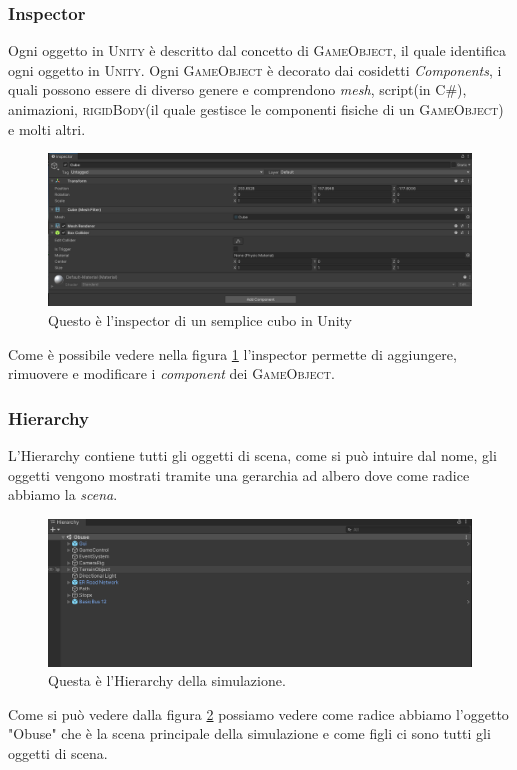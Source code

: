 \documentclass[12pt, openany]{book}
\begin{document}
	\subsubsection{Inspector}
	Ogni oggetto in \textsc{Unity} è descritto dal concetto di \textsc{GameObject}, il quale identifica ogni oggetto in \textsc{Unity}. Ogni \textsc{GameObject} è decorato dai cosidetti \emph{Components}, i quali possono essere di diverso genere e comprendono \emph{mesh}, script(in C\#), animazioni, \textsc{rigidBody}(il quale gestisce le componenti fisiche di un \textsc{GameObject}) e molti altri.
	\begin{figure}[H]
		\centering
		\includegraphics[width=1\linewidth]{"Immagini/Inspector"}
		\caption{Questo è l'inspector di un semplice cubo in Unity}
		\label{fig:Inspector}
	\end{figure}

	Come è possibile vedere nella figura \ref{fig:Inspector} l'inspector permette di aggiungere, rimuovere e modificare i \emph{component} dei \textsc{GameObject}.
	\subsubsection{Hierarchy}
	L'Hierarchy contiene tutti gli oggetti di scena, come si può intuire dal nome, gli oggetti vengono mostrati tramite una gerarchia ad albero dove come radice abbiamo la \emph{scena}.
	\begin{figure}[H]
		\centering
		\includegraphics[width=1\linewidth]{"Immagini/Hierarchy"}
		\caption{Questa è l'Hierarchy della simulazione.}
		\label{fig:Hierarchy}
	\end{figure}
	Come si può vedere dalla figura \ref{fig:Hierarchy} possiamo vedere come radice abbiamo l'oggetto "Obuse" che è la scena principale della simulazione e come figli ci sono tutti gli oggetti di scena.
\end{document}
